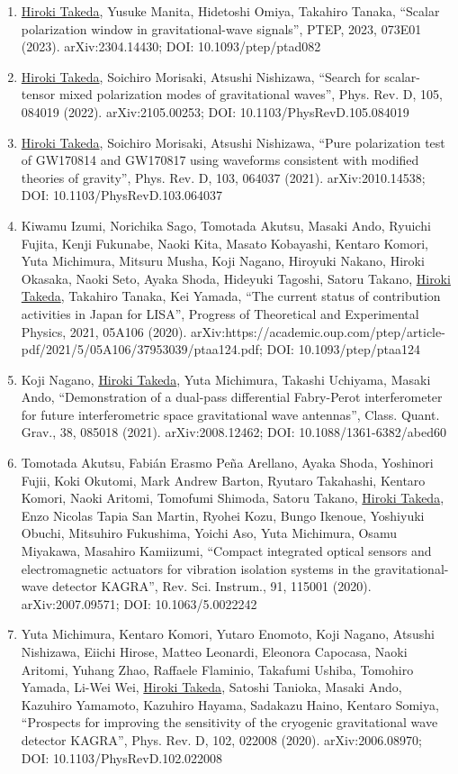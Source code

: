 \documentclass[uplatex, 11pt]{jsarticle}
\begin{document}
\begin{enumerate}
\item \uline{Hiroki Takeda}, Yusuke Manita, Hidetoshi Omiya, Takahiro Tanaka, “Scalar polarization window in gravitational-wave signals”, PTEP, 2023, 073E01 (2023). arXiv:2304.14430; DOI: 10.1093/ptep/ptad082
\item \uline{Hiroki Takeda}, Soichiro Morisaki, Atsushi Nishizawa, “Search for scalar-tensor mixed polarization modes of gravitational waves”, Phys. Rev. D, 105, 084019 (2022). arXiv:2105.00253; DOI: 10.1103/PhysRevD.105.084019
\item \uline{Hiroki Takeda}, Soichiro Morisaki, Atsushi Nishizawa, “Pure polarization test of GW170814 and GW170817 using waveforms consistent with modified theories of gravity”, Phys. Rev. D, 103, 064037 (2021). arXiv:2010.14538; DOI: 10.1103/PhysRevD.103.064037
\item Kiwamu Izumi, Norichika Sago, Tomotada Akutsu, Masaki Ando, Ryuichi Fujita, Kenji Fukunabe, Naoki Kita, Masato Kobayashi, Kentaro Komori, Yuta Michimura, Mitsuru Musha, Koji Nagano, Hiroyuki Nakano, Hiroki Okasaka, Naoki Seto, Ayaka Shoda, Hideyuki Tagoshi, Satoru Takano, \uline{Hiroki Takeda}, Takahiro Tanaka, Kei Yamada, “The current status of contribution activities in Japan for LISA”, Progress of Theoretical and Experimental Physics, 2021, 05A106 (2020). arXiv:https://academic.oup.com/ptep/article-pdf/2021/5/05A106/37953039/ptaa124.pdf; DOI: 10.1093/ptep/ptaa124
\item Koji Nagano, \uline{Hiroki Takeda}, Yuta Michimura, Takashi Uchiyama, Masaki Ando, “Demonstration of a dual-pass differential Fabry-Perot interferometer for future interferometric space gravitational wave antennas”, Class. Quant. Grav., 38, 085018 (2021). arXiv:2008.12462; DOI: 10.1088/1361-6382/abed60
\item Tomotada Akutsu, Fabián Erasmo Peña Arellano, Ayaka Shoda, Yoshinori Fujii, Koki Okutomi, Mark Andrew Barton, Ryutaro Takahashi, Kentaro Komori, Naoki Aritomi, Tomofumi Shimoda, Satoru Takano, \uline{Hiroki Takeda}, Enzo Nicolas Tapia San Martin, Ryohei Kozu, Bungo Ikenoue, Yoshiyuki Obuchi, Mitsuhiro Fukushima, Yoichi Aso, Yuta Michimura, Osamu Miyakawa, Masahiro Kamiizumi, “Compact integrated optical sensors and electromagnetic actuators for vibration isolation systems in the gravitational-wave detector KAGRA”, Rev. Sci. Instrum., 91, 115001 (2020). arXiv:2007.09571; DOI: 10.1063/5.0022242
\item Yuta Michimura, Kentaro Komori, Yutaro Enomoto, Koji Nagano, Atsushi Nishizawa, Eiichi Hirose, Matteo Leonardi, Eleonora Capocasa, Naoki Aritomi, Yuhang Zhao, Raffaele Flaminio, Takafumi Ushiba, Tomohiro Yamada, Li-Wei Wei, \uline{Hiroki Takeda}, Satoshi Tanioka, Masaki Ando, Kazuhiro Yamamoto, Kazuhiro Hayama, Sadakazu Haino, Kentaro Somiya, “Prospects for improving the sensitivity of the cryogenic gravitational wave detector KAGRA”, Phys. Rev. D, 102, 022008 (2020). arXiv:2006.08970; DOI: 10.1103/PhysRevD.102.022008

\end{enumerate}
\end{document}
